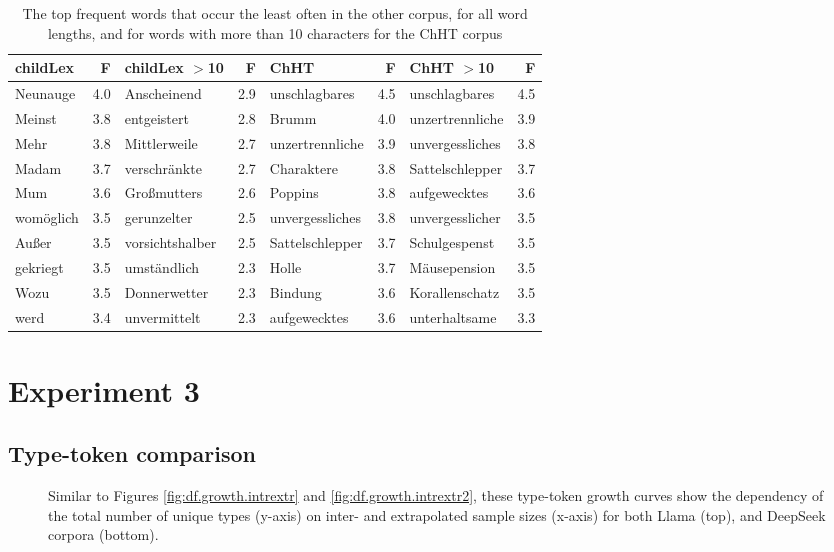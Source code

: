 \documentclass[manuscript]{stjour}
\begin{document}
\begin{table}[!htbp]
\caption{The top frequent words that occur the least often in the other corpus, for all word lengths, and for words with more than 10 characters for the ChHT corpus}
\centering
\begin{tabular}{lrlrlrlr}
  \hline
childLex & F & childLex $>$10 & F & ChHT & F & ChHT $>$10 & F \\ 
  \hline
Neunauge & 4.0 & Anscheinend & 2.9 & unschlagbares & 4.5 & unschlagbares & 4.5 \\ 
  Meinst & 3.8 & entgeistert & 2.8 & Brumm & 4.0 & unzertrennliche & 3.9 \\ 
  Mehr & 3.8 & Mittlerweile & 2.7 & unzertrennliche & 3.9 & unvergessliches & 3.8 \\ 
  Madam & 3.7 & verschränkte & 2.7 & Charaktere & 3.8 & Sattelschlepper & 3.7 \\ 
  Mum & 3.6 & Großmutters & 2.6 & Poppins & 3.8 & aufgewecktes & 3.6 \\ 
  womöglich & 3.5 & gerunzelter & 2.5 & unvergessliches & 3.8 & unvergesslicher & 3.5 \\ 
  Außer & 3.5 & vorsichtshalber & 2.5 & Sattelschlepper & 3.7 & Schulgespenst & 3.5 \\ 
  gekriegt & 3.5 & umständlich & 2.3 & Holle & 3.7 & Mäusepension & 3.5 \\ 
  Wozu & 3.5 & Donnerwetter & 2.3 & Bindung & 3.6 & Korallenschatz & 3.5 \\ 
  werd & 3.4 & unvermittelt & 2.3 & aufgewecktes & 3.6 & unterhaltsame & 3.3 \\ 
   \hline
\end{tabular}
\label{words-chht-low}
\end{table}

\clearpage

\section{Experiment 3}

\subsection{Type-token comparison}

\begin{figure}[!htbp]
    \caption{Similar to Figures \ref{fig:df.growth.intrextr} and \ref{fig:df.growth.intrextr2}, these type-token growth curves show the dependency of the total number of unique types (y-axis) on inter- and extrapolated sample sizes (x-axis) for both Llama (top), and DeepSeek corpora (bottom).}
    \label{fig:df.growth.intrextr3}
  \hfill
\end{figure}
\end{document}
